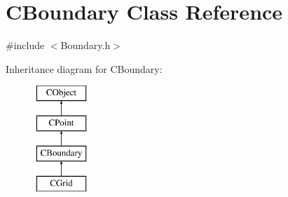 \hypertarget{classCBoundary}{}\section{C\+Boundary Class Reference}
\label{classCBoundary}


{\ttfamily \#include $<$Boundary.\+h$>$}

Inheritance diagram for C\+Boundary\+:\begin{figure}[H]
\begin{center}
\leavevmode
\includegraphics[height=4.000000cm]{classCBoundary}
\end{center}
\end{figure}
